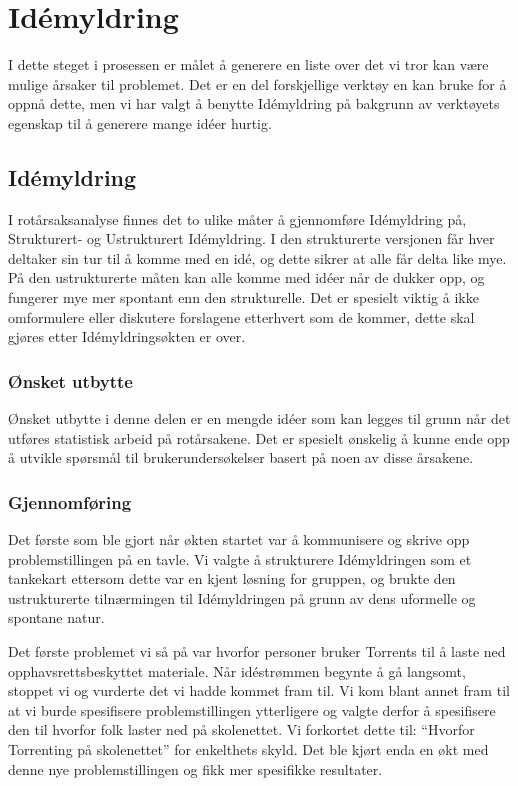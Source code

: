 \chapter{Idémyldring}
I dette steget i prosessen er målet å generere en liste over det vi tror kan være mulige årsaker til problemet. Det er en del forskjellige verktøy en kan bruke for å oppnå dette, men vi har valgt å benytte Idémyldring på bakgrunn av verktøyets egenskap til å generere mange idéer hurtig.

\section{Idémyldring}
I rotårsaksanalyse finnes det to ulike måter å gjennomføre Idémyldring på, Strukturert- og Ustrukturert Idémyldring. I den strukturerte versjonen får hver deltaker sin tur til å komme med en idé, og dette sikrer at alle får delta like mye. På den ustrukturerte måten kan alle komme med idéer når de dukker opp, og fungerer mye mer spontant enn den strukturelle. Det er spesielt viktig å ikke omformulere eller diskutere forslagene etterhvert som de kommer, dette skal gjøres etter Idémyldringsøkten er over.

\subsection{Ønsket utbytte}
Ønsket utbytte i denne delen er en mengde idéer som kan legges til grunn når det utføres statistisk arbeid på rotårsakene. Det er spesielt ønskelig å kunne ende opp å utvikle spørsmål til brukerundersøkelser basert på noen av disse årsakene.

\subsection{Gjennomføring}
Det første som ble gjort når økten startet var å kommunisere og skrive opp problemstillingen på en tavle. Vi valgte å strukturere Idémyldringen som et tankekart ettersom dette var en kjent løsning for gruppen, og brukte den ustrukturerte tilnærmingen til Idémyldringen på grunn av dens uformelle og spontane natur. 

Det første problemet vi så på var hvorfor personer bruker Torrents til å laste ned opphavsrettsbeskyttet materiale. Når idéstrømmen begynte å gå langsomt, stoppet vi og vurderte det vi hadde kommet fram til. Vi kom blant annet fram til at vi burde spesifisere problemstillingen ytterligere og valgte derfor å spesifisere den til hvorfor folk laster ned på skolenettet. Vi forkortet dette til: ``Hvorfor Torrenting på skolenettet'' for enkelthets skyld. Det ble kjørt enda en økt med denne nye problemstillingen og fikk mer spesifikke resultater. 

